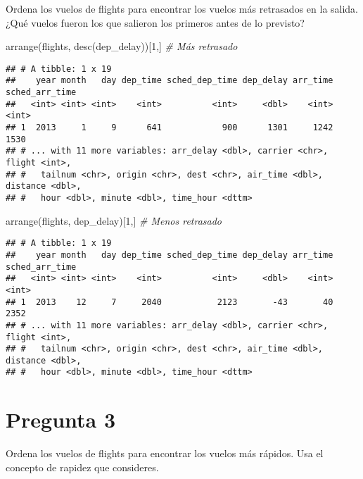 \documentclass[
]{article}
\newenvironment{Shaded}{\begin{snugshade}}{\end{snugshade}}
\newcommand{\CommentTok}[1]{\textcolor[rgb]{0.56,0.35,0.01}{\textit{#1}}}
\newcommand{\DecValTok}[1]{\textcolor[rgb]{0.00,0.00,0.81}{#1}}
\newcommand{\FunctionTok}[1]{\textcolor[rgb]{0.00,0.00,0.00}{#1}}
\newcommand{\NormalTok}[1]{#1}
\begin{document}
Ordena los vuelos de flights para encontrar los vuelos más retrasados en
la salida. ¿Qué vuelos fueron los que salieron los primeros antes de lo
previsto?

\begin{Shaded}
\begin{Highlighting}[]
\FunctionTok{arrange}\NormalTok{(flights, }\FunctionTok{desc}\NormalTok{(dep\_delay))[}\DecValTok{1}\NormalTok{,] }\CommentTok{\# Más retrasado}
\end{Highlighting}
\end{Shaded}

\begin{verbatim}
## # A tibble: 1 x 19
##    year month   day dep_time sched_dep_time dep_delay arr_time sched_arr_time
##   <int> <int> <int>    <int>          <int>     <dbl>    <int>          <int>
## 1  2013     1     9      641            900      1301     1242           1530
## # ... with 11 more variables: arr_delay <dbl>, carrier <chr>, flight <int>,
## #   tailnum <chr>, origin <chr>, dest <chr>, air_time <dbl>, distance <dbl>,
## #   hour <dbl>, minute <dbl>, time_hour <dttm>
\end{verbatim}

\begin{Shaded}
\begin{Highlighting}[]
\FunctionTok{arrange}\NormalTok{(flights, dep\_delay)[}\DecValTok{1}\NormalTok{,] }\CommentTok{\# Menos retrasado}
\end{Highlighting}
\end{Shaded}

\begin{verbatim}
## # A tibble: 1 x 19
##    year month   day dep_time sched_dep_time dep_delay arr_time sched_arr_time
##   <int> <int> <int>    <int>          <int>     <dbl>    <int>          <int>
## 1  2013    12     7     2040           2123       -43       40           2352
## # ... with 11 more variables: arr_delay <dbl>, carrier <chr>, flight <int>,
## #   tailnum <chr>, origin <chr>, dest <chr>, air_time <dbl>, distance <dbl>,
## #   hour <dbl>, minute <dbl>, time_hour <dttm>
\end{verbatim}

\hypertarget{pregunta-3}{%
\section{Pregunta 3}\label{pregunta-3}}

Ordena los vuelos de flights para encontrar los vuelos más rápidos. Usa
el concepto de rapidez que consideres.
\end{document}
